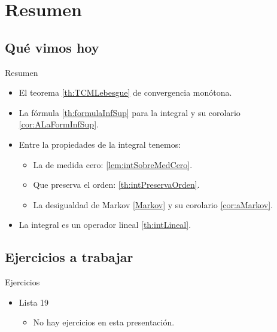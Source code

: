 \documentclass[utf8]{beamer}
\theoremstyle{plain}
\theoremstyle{definition}
\theoremstyle{remark}
\numberwithin{equation}{section}
\renewcommand{\.}{\Cdot}                %
\begin{document}
\section*{Resumen}

\subsection*{Qu\'e vimos hoy}

\begin{frame}{Resumen}

  \begin{itemize}
  \item El teorema \ref{th:TCMLebesgue} de convergencia monótona.
  \item La fórmula \ref{th:formulaInfSup} para la integral y su corolario \ref{cor:ALaFormInfSup}.
  \item Entre la propiedades de la integral tenemos:
  \begin{itemize}
    \item La de medida cero: \ref{lem:intSobreMedCero}.
    \item Que preserva el orden: \ref{th:intPreservaOrden}.
    \item La desigualdad de Markov \ref{Markov} y su corolario \ref{cor:aMarkov}.
  \end{itemize}
  \item La integral es un operador lineal \ref{th:intLineal}.
  \end{itemize}
  
\end{frame}

\subsection*{Ejercicios a trabajar}
\begin{frame}{Ejercicios}
    
  \begin{itemize}
    \item
      Lista 19
      \begin{itemize}
      \item No hay ejercicios en esta presentación.
      \end{itemize}
    \end{itemize}
  
\end{frame}


\appendix
\end{document}
